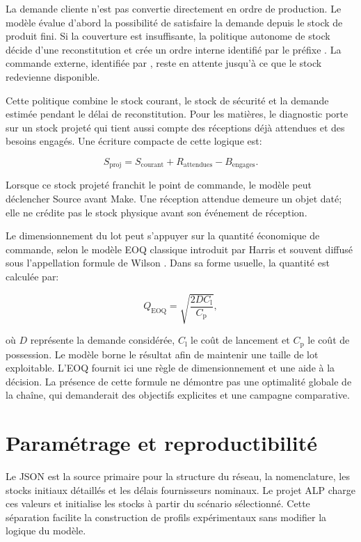 La demande cliente n'est pas convertie directement en ordre de production. Le modèle évalue d'abord la possibilité de satisfaire la demande depuis le stock de produit fini. Si la couverture est insuffisante, la politique autonome de stock décide d'une reconstitution et crée un ordre interne identifié par le préfixe . La commande externe, identifiée par , reste en attente jusqu'à ce que le stock redevienne disponible.

Cette politique combine le stock courant, le stock de sécurité et la demande estimée pendant le délai de reconstitution. Pour les matières, le diagnostic porte sur un stock projeté qui tient aussi compte des réceptions déjà attendues et des besoins engagés. Une écriture compacte de cette logique est:

\[
S_{\mathrm{proj}} = S_{\mathrm{courant}} + R_{\mathrm{attendues}} - B_{\mathrm{engages}}.
\]

Lorsque ce stock projeté franchit le point de commande, le modèle peut déclencher Source avant Make. Une réception attendue demeure un objet daté; elle ne crédite pas le stock physique avant son événement de réception.

Le dimensionnement du lot peut s'appuyer sur la quantité économique de commande, selon le modèle EOQ classique introduit par Harris et souvent diffusé sous l'appellation formule de Wilson \cite{harris1913,erlenkotter1990}. Dans sa forme usuelle, la quantité est calculée par:

\[
Q_{\mathrm{EOQ}} = \sqrt{\frac{2 D C_{\mathrm{l}}}{C_{\mathrm{p}}}},
\]

où \(D\) représente la demande considérée, \(C_{\mathrm{l}}\) le coût de lancement et \(C_{\mathrm{p}}\) le coût de possession. Le modèle borne le résultat afin de maintenir une taille de lot exploitable. L'EOQ fournit ici une règle de dimensionnement et une aide à la décision. La présence de cette formule ne démontre pas une optimalité globale de la chaîne, qui demanderait des objectifs explicites et une campagne comparative.

\section{Paramétrage et reproductibilité}

Le JSON est la source primaire pour la structure du réseau, la nomenclature, les stocks initiaux détaillés et les délais fournisseurs nominaux. Le projet ALP charge ces valeurs et initialise les stocks à partir du scénario sélectionné. Cette séparation facilite la construction de profils expérimentaux sans modifier la logique du modèle.

